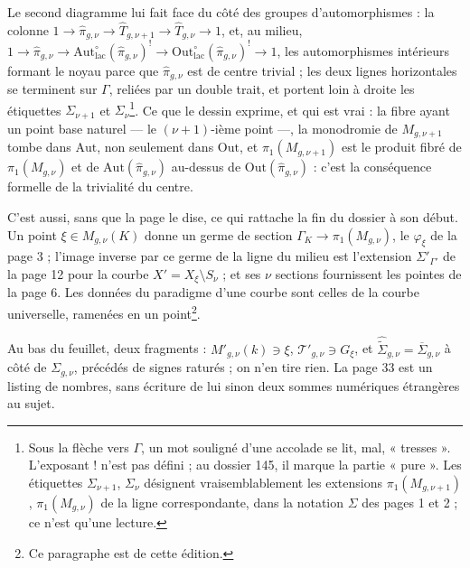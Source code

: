 \documentclass[11pt,a4paper]{article}
\begin{document}
Le second diagramme lui fait face du côté des groupes d'automorphismes : la
colonne $1 \to \widehat\pi_{g,\nu} \to \widehat T_{g,\nu+1} \to \widehat
T_{g,\nu} \to 1$, et, au milieu, $1 \to \widehat\pi_{g,\nu} \to
\mathrm{Aut}^{\circ}_{\mathrm{lac}}(\widehat\pi_{g,\nu})^{!} \to
\mathrm{Out}^{\circ}_{\mathrm{lac}}(\widehat\pi_{g,\nu})^{!} \to 1$, les automorphismes
intérieurs formant le noyau parce que $\widehat\pi_{g,\nu}$ est de centre
trivial ; les deux lignes horizontales se terminent sur $\Gamma$, reliées par
un double trait, et portent loin à droite les étiquettes $\Sigma_{\nu+1}$ et
$\Sigma_\nu$\footnote{Sous la flèche vers $\Gamma$, un mot souligné d'une
accolade se lit, mal, « tresses ». L'exposant $!$ n'est pas défini ; au dossier
145, il marque la partie « pure ». Les étiquettes $\Sigma_{\nu+1}$, $\Sigma_\nu$
désignent vraisemblablement les extensions $\pi_1(M_{g,\nu+1})$,
$\pi_1(M_{g,\nu})$ de la ligne correspondante, dans la notation $\Sigma$ des
pages 1 et 2 ; ce n'est qu'une lecture.}. Ce que le dessin exprime, et qui est
vrai : la fibre ayant un point base naturel — le $(\nu + 1)$-ième point —, la
monodromie de $M_{g,\nu+1}$ tombe dans $\mathrm{Aut}$, non seulement dans
$\mathrm{Out}$, et $\pi_1(M_{g,\nu+1})$ est le produit fibré de
$\pi_1(M_{g,\nu})$ et de $\mathrm{Aut}(\widehat\pi_{g,\nu})$ au-dessus de
$\mathrm{Out}(\widehat\pi_{g,\nu})$ : c'est la conséquence formelle de la
trivialité du centre.

C'est aussi, sans que la page le dise, ce qui rattache la fin du dossier à son
début. Un point $\xi \in M_{g,\nu}(K)$ donne un germe de section $\Gamma_K \to
\pi_1(M_{g,\nu})$, le $\varphi_\xi$ de la page 3 ; l'image inverse par ce germe
de la ligne du milieu est l'extension $\Sigma'_{\Gamma'}$ de la page 12 pour la
courbe $X' = X_\xi \setminus S_\nu$ ; et ses $\nu$ sections fournissent les
pointes de la page 6. Les données du paradigme d'une courbe sont celles de la
courbe universelle, ramenées en un point\footnote{Ce paragraphe est de cette
édition.}.

Au bas du feuillet, deux fragments : $M'_{g,\nu}(k) \ni \xi$,
$\mathcal{T}'_{g,\nu} \ni G_\xi$, et $\widehat{\widetilde\Sigma}_{g,\nu} =
\overline{\Sigma}_{g,\nu}$ à côté de $\Sigma_{g,\nu}$, précédés de signes
raturés ; on n'en tire rien. La page 33 est un listing de nombres, sans
écriture de lui sinon deux sommes numériques étrangères au sujet.
\end{document}
